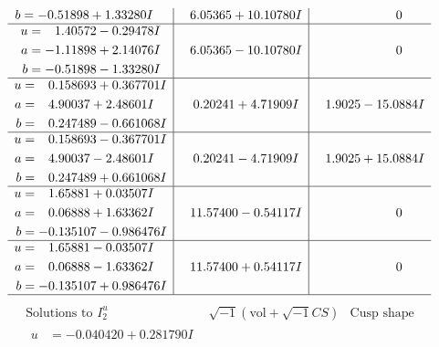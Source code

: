 \documentclass[1p]{elsarticle_modified}
\theoremstyle{definition}
\newcommand{\I}{\sqrt{-1}}
\begin{document}
$$\begin{array}{c|c|c}
\begin{aligned}
b &= -0.51898 + 1.33280 I\end{aligned}
 & \phantom{-}6.05365 + 10.10780 I & \phantom{-0.000000 } 0 \\ \hline\begin{aligned}
u &= \phantom{-}1.40572 - 0.29478 I \\
a &= -1.11898 + 2.14076 I \\
b &= -0.51898 - 1.33280 I\end{aligned}
 & \phantom{-}6.05365 - 10.10780 I & \phantom{-0.000000 } 0 \\ \hline\begin{aligned}
u &= \phantom{-}0.158693 + 0.367701 I \\
a &= \phantom{-}4.90037 + 2.48601 I \\
b &= \phantom{-}0.247489 - 0.661068 I\end{aligned}
 & \phantom{-}0.20241 + 4.71909 I & \phantom{-}1.9025 - 15.0884 I \\ \hline\begin{aligned}
u &= \phantom{-}0.158693 - 0.367701 I \\
a &= \phantom{-}4.90037 - 2.48601 I \\
b &= \phantom{-}0.247489 + 0.661068 I\end{aligned}
 & \phantom{-}0.20241 - 4.71909 I & \phantom{-}1.9025 + 15.0884 I \\ \hline\begin{aligned}
u &= \phantom{-}1.65881 + 0.03507 I \\
a &= \phantom{-}0.06888 + 1.63362 I \\
b &= -0.135107 - 0.986476 I\end{aligned}
 & \phantom{-}11.57400 - 0.54117 I & \phantom{-0.000000 } 0 \\ \hline\begin{aligned}
u &= \phantom{-}1.65881 - 0.03507 I \\
a &= \phantom{-}0.06888 - 1.63362 I \\
b &= -0.135107 + 0.986476 I\end{aligned}
 & \phantom{-}11.57400 + 0.54117 I & \phantom{-0.000000 } 0\\
 \hline 
 \end{array}$$\newpage$$\begin{array}{c|c|c}  
\text{Solutions to }I^u_{2}& \I (\text{vol} + \sqrt{-1}CS) & \text{Cusp shape}\\
 \hline 
\begin{aligned}
u &= -0.040420 + 0.281790 I \\

\end{aligned}
\end{array}$$
\end{document}

